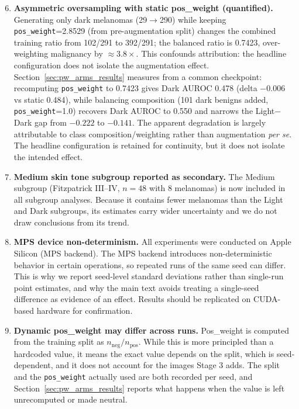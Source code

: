 \begin{enumerate}
    \setcounter{enumi}{5}
    \item \textbf{Asymmetric oversampling with static pos\_weight (quantified).} Generating only dark melanomas (29$\to$290) while keeping \texttt{pos\_weight}=2.8529 (from pre-augmentation split) changes the combined training ratio from 102/291 to 392/291; the balanced ratio is 0.7423, over-weighting malignancy by $\approx 3.8\times$. This confounds attribution: the headline configuration does not isolate the augmentation effect. Section~\ref{sec:pw_arms_results} measures from a common checkpoint: recomputing \texttt{pos\_weight} to 0.7423 gives Dark AUROC 0.478 (delta $-0.006$ vs static 0.484), while balancing composition (101 dark benigns added, \texttt{pos\_weight}=1.0) recovers Dark AUROC to 0.550 and narrows the Light$-$Dark gap from $-0.222$ to $-0.141$. The apparent degradation is largely attributable to class composition/weighting rather than augmentation \emph{per se}. The headline configuration is retained for continuity, but it does not isolate the intended effect.

    \item \textbf{Medium skin tone subgroup reported as secondary.} The Medium subgroup (Fitzpatrick III--IV, $n=48$ with 8 melanomas) is now included in all subgroup analyses. Because it contains fewer melanomas than the Light and Dark subgroups, its estimates carry wider uncertainty and we do not draw conclusions from its trend.

    \item \textbf{MPS device non-determinism.} All experiments were conducted on Apple Silicon (MPS backend). The MPS backend introduces non-deterministic behavior in certain operations, so repeated runs of the same seed can differ. This is why we report seed-level standard deviations rather than single-run point estimates, and why the main text avoids treating a single-seed difference as evidence of an effect. Results should be replicated on CUDA-based hardware for confirmation.

    \item \textbf{Dynamic pos\_weight may differ across runs.} Pos\_weight is computed from the training split as $n_{\text{neg}}/n_{\text{pos}}$. While this is more principled than a hardcoded value, it means the exact value depends on the split, which is seed-dependent, and it does not account for the images Stage 3 adds. The split and the \texttt{pos\_weight} actually used are both recorded per seed, and Section~\ref{sec:pw_arms_results} reports what happens when the value is left unrecomputed or made neutral.


\end{enumerate}
